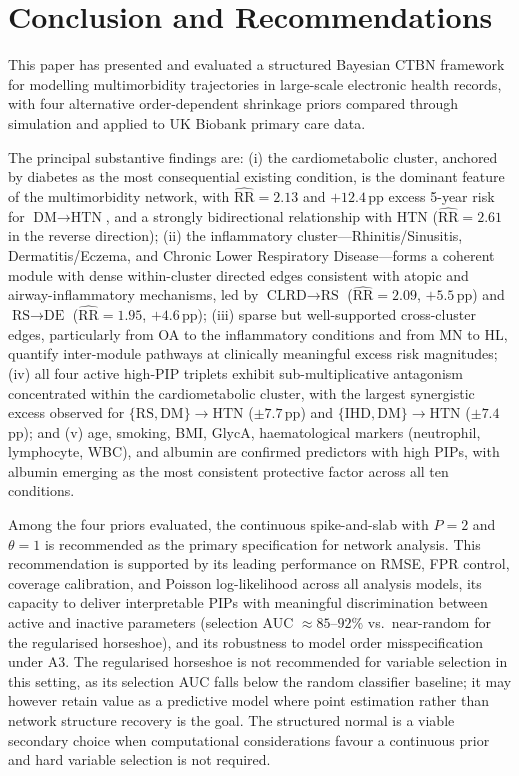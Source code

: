 \documentclass[12pt]{article}
\begin{document}
\section{Conclusion and Recommendations}
\label{sec:conclusion}

This paper has presented and evaluated a structured Bayesian CTBN framework for modelling multimorbidity trajectories in large-scale electronic health 
records, with four alternative order-dependent shrinkage priors compared through simulation and applied to UK Biobank primary care data.

The principal substantive findings are: (i) the cardiometabolic cluster, anchored by diabetes as the most consequential existing condition, is the 
dominant feature of the multimorbidity network, with 
$\widehat{\text{RR}} = 2.13$ and $+12.4$\,pp excess 5-year risk for $\text{DM} \to \text{HTN}$, and a strongly bidirectional relationship with 
HTN ($\widehat{\text{RR}} = 2.61$ in the reverse direction); (ii) the inflammatory cluster---Rhinitis/Sinusitis, Dermatitis/Eczema, and Chronic 
Lower Respiratory Disease---forms a coherent module with dense within-cluster directed edges consistent with atopic and airway-inflammatory mechanisms, led 
by $\text{CLRD} \to \text{RS}$ ($\widehat{\text{RR}} = 2.09$, $+5.5$\,pp) and $\text{RS} \to \text{DE}$ ($\widehat{\text{RR}} = 1.95$, $+4.6$\,pp); 
(iii) sparse but well-supported cross-cluster edges, particularly from OA to the inflammatory conditions and from MN to HL, quantify inter-module 
pathways at clinically meaningful excess risk magnitudes; (iv) all four active high-PIP triplets exhibit sub-multiplicative antagonism concentrated 
within the cardiometabolic cluster, with the largest synergistic excess observed for $\{\text{RS}, \text{DM}\} \to \text{HTN}$ ($\pm7.7$\,pp) and 
$\{\text{IHD}, \text{DM}\} \to \text{HTN}$ ($\pm7.4$\,pp); and (v) age, smoking, BMI, GlycA, haematological markers (neutrophil, lymphocyte, WBC), 
and albumin are confirmed predictors with high PIPs, with albumin emerging as the most consistent protective factor across all ten conditions.

Among the four priors evaluated, the continuous spike-and-slab with $P = 2$ and $\theta = 1$ is recommended as the primary specification for network analysis. This recommendation is supported by its leading performance on RMSE, FPR control, coverage calibration, and Poisson log-likelihood across all analysis models, its capacity to deliver interpretable PIPs with meaningful discrimination between active and inactive parameters (selection 
AUC $\approx 85\text{--}92\%$ vs.\ near-random for the regularised horseshoe), and its robustness to model order misspecification under A3. The regularised 
horseshoe is not recommended for variable selection in this setting, as its selection AUC falls below the random classifier baseline; it may however retain value as a predictive model where point estimation rather than network structure recovery is the goal. The structured normal is a viable secondary 
choice when computational considerations favour a continuous prior and hard variable selection is not required.
\end{document}
